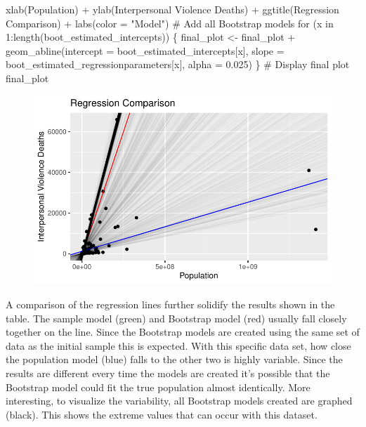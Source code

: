 \documentclass[
  letterpaper,
  DIV=11,
  numbers=noendperiod]{scrartcl}
\newenvironment{Shaded}{\begin{snugshade}}{\end{snugshade}}
\newcommand{\AttributeTok}[1]{\textcolor[rgb]{0.40,0.45,0.13}{#1}}
\newcommand{\CommentTok}[1]{\textcolor[rgb]{0.37,0.37,0.37}{#1}}
\newcommand{\ControlFlowTok}[1]{\textcolor[rgb]{0.00,0.23,0.31}{#1}}
\newcommand{\DecValTok}[1]{\textcolor[rgb]{0.68,0.00,0.00}{#1}}
\newcommand{\FloatTok}[1]{\textcolor[rgb]{0.68,0.00,0.00}{#1}}
\newcommand{\FunctionTok}[1]{\textcolor[rgb]{0.28,0.35,0.67}{#1}}
\newcommand{\NormalTok}[1]{\textcolor[rgb]{0.00,0.23,0.31}{#1}}
\newcommand{\OtherTok}[1]{\textcolor[rgb]{0.00,0.23,0.31}{#1}}
\newcommand{\SpecialCharTok}[1]{\textcolor[rgb]{0.37,0.37,0.37}{#1}}
\newcommand{\StringTok}[1]{\textcolor[rgb]{0.13,0.47,0.30}{#1}}
\begin{document}
\begin{Shaded}
\begin{Highlighting}[]
              \FunctionTok{xlab}\NormalTok{(}\StringTok{\textquotesingle{}Population\textquotesingle{}}\NormalTok{) }\SpecialCharTok{+} 
              \FunctionTok{ylab}\NormalTok{(}\StringTok{\textquotesingle{}Interpersonal Violence Deaths\textquotesingle{}}\NormalTok{) }\SpecialCharTok{+}
              \FunctionTok{ggtitle}\NormalTok{(}\StringTok{\textquotesingle{}Regression Comparison\textquotesingle{}}\NormalTok{) }\SpecialCharTok{+}
              \FunctionTok{labs}\NormalTok{(}\AttributeTok{color =} \StringTok{"Model"}\NormalTok{)}
\CommentTok{\# Add all Bootstrap models}
\ControlFlowTok{for}\NormalTok{ (x }\ControlFlowTok{in} \DecValTok{1}\SpecialCharTok{:}\FunctionTok{length}\NormalTok{(boot\_estimated\_intercepts)) \{}
\NormalTok{  final\_plot }\OtherTok{\textless{}{-}}\NormalTok{ final\_plot }\SpecialCharTok{+} 
                \FunctionTok{geom\_abline}\NormalTok{(}\AttributeTok{intercept =}\NormalTok{ boot\_estimated\_intercepts[x], }
                            \AttributeTok{slope =}\NormalTok{ boot\_estimated\_regressionparameters[x], }
                            \AttributeTok{alpha =} \FloatTok{0.025}\NormalTok{)}
\NormalTok{\}}
\CommentTok{\# Display final plot}
\NormalTok{final\_plot}
\end{Highlighting}
\end{Shaded}

\begin{figure}[H]

{\centering \includegraphics{Bootstrapping-Group-Report_files/figure-pdf/unnamed-chunk-24-1.pdf}

}

\end{figure}

A comparison of the regression lines further solidify the results shown
in the table. The sample model (green) and Bootstrap model (red) usually
fall closely together on the line. Since the Bootstrap models are
created using the same set of data as the initial sample this is
expected. With this specific data set, how close the population model
(blue) falls to the other two is highly variable. Since the results are
different every time the models are created it's possible that the
Bootstrap model could fit the true population almost identically. More
interesting, to visualize the variability, all Bootstrap models created
are graphed (black). This shows the extreme values that can occur with
this dataset.
\end{document}
